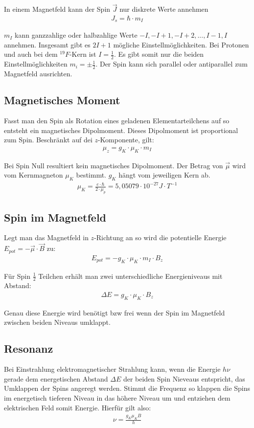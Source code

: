 \documentclass[12pt]{article}
\begin{document}
In einem Magnetfeld kann der Spin $\vec{J}$ nur diskrete Werte annehmen
\begin{align}
 J_s = \hbar \cdot m_{I}
\end{align}

$m_I$ kann ganzzahlige oder halbzahlige Werte $-I, -I+1, -I+2, ..., I-1, I$ annehmen. Insgesamt gibt es $2I+1$ mögliche Einstellmöglichkeiten. Bei Protonen und auch bei dem $^19 F$-Kern ist $I = \frac{1}{2}$. Es gibt somit nur die beiden Einstellmöglichkeiten $m_i = \pm \frac{1}{2}$. Der Spin kann sich parallel oder antiparallel zum Magnetfeld ausrichten.

\subsection{Magnetisches Moment}
Fasst man den Spin als Rotation eines geladenen Elementarteilchens auf so entsteht ein magnetisches Dipolmoment. Dieses Dipolmoment ist proportional zum Spin. Beschränkt auf dei $z$-Komponente, gilt:
\begin{align}
 \mu_z = g_K \cdot \mu_K \cdot m_I
\end{align}

Bei Spin Null resultiert kein magnetisches Dipolmoment. Der Betrag von $\vec\mu$ wird vom Kernmagneton $\mu_K$ bestimmt. $g_K$ hängt vom jeweiligen Kern ab.
\begin{align}
 \mu_K = \frac{e \cdot \hbar}{2 \cdot \mu_p} = 5,05079 \cdot 10^{-27} J \cdot T^{-1}
\end{align}

\subsection{Spin im Magnetfeld}
Legt man das Magnetfeld in $z$-Richtung an so wird die potentielle Energie $E_{pot} = -\vec\mu \cdot \vec B$ zu:
\begin{align}
 E_{pot} = -g_K \cdot \mu_K \cdot m_I \cdot B_z
\end{align}

Für Spin $\frac{1}{2}$ Teilchen erhält man zwei unterschiedliche Energieniveaus mit Abstand:
\begin{align}
 \Delta E = g_K \cdot \mu_K \cdot B_z
\end{align}

Genau diese Energie wird benötigt bzw frei wenn der Spin im Magnetfeld zwischen beiden Niveaus umklappt.

\subsection{Resonanz}
Bei Einstrahlung elektromagnetischer Strahlung kann, wenn die Energie $h\nu$ gerade dem energetischen Abstand $\Delta E$ der beiden Spin Nieveaus entspricht, das Umklappen der Spins angeregt werden. Stimmt die Frequenz so klappen die Spins im energetisch tieferen Niveau in das höhere Niveau um und entziehen dem elektrischen Feld somit Energie. Hierfür gilt also:
\begin{align}
 \nu = \frac{g_K \mu_K B}{h}
\label{resfreq}
\end{align}
\end{document}
